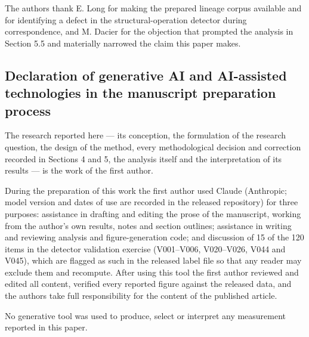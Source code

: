 The authors thank E. Long for making the prepared lineage corpus available and for identifying a defect in the structural-operation detector during correspondence, and M. Dacier for the objection that prompted the analysis in Section 5.5 and materially narrowed the claim this paper makes.

\subsection{Declaration of generative AI and AI-assisted technologies in the manuscript preparation process}

The research reported here --- its conception, the formulation of the research question, the design of the method, every methodological decision and correction recorded in Sections 4 and 5, the analysis itself and the interpretation of its results --- is the work of the first author.

During the preparation of this work the first author used Claude (Anthropic; model version and dates of use are recorded in the released repository) for three purposes: assistance in drafting and editing the prose of the manuscript, working from the author's own results, notes and section outlines; assistance in writing and reviewing analysis and figure-generation code; and discussion of 15 of the 120 items in the detector validation exercise (V001--V006, V020--V026, V044 and V045), which are flagged as such in the released label file so that any reader may exclude them and recompute. After using this tool the first author reviewed and edited all content, verified every reported figure against the released data, and the authors take full responsibility for the content of the published article.

No generative tool was used to produce, select or interpret any measurement reported in this paper.
